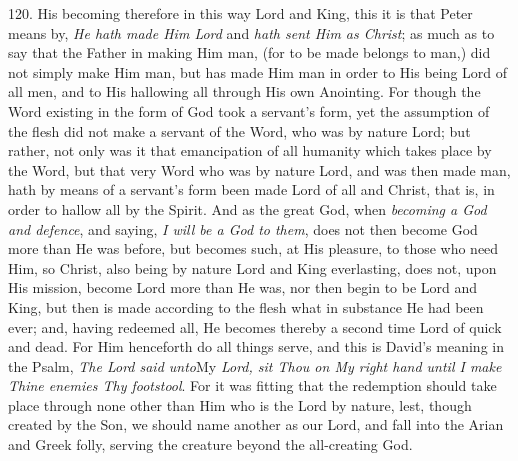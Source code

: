 120. His becoming therefore in
this way Lord and King, this it is that Peter means by, \emph{He hath
made Him Lord} and \emph{hath sent Him as Christ}; as much as to
say that the Father in making Him man, (for to be made belongs to
man,) did not simply make Him man, but has made Him man in order to
His being Lord of all men, and to His hallowing all through His own
Anointing. For though the Word existing in the form of God took a
servant's form, yet the assumption of the flesh did not make a servant
of the Word, who was by nature Lord; but rather, not only was it
that emancipation of all humanity which takes place by the Word, but
that very Word who was by nature Lord, and was then made man, hath by
means of a servant's form been made Lord of all and Christ, that is,
in order to hallow all by the Spirit. And as the great God, when \emph{becoming
a God and defence}, and saying, \emph{I will be a God to them},
does not then become God more than He was before, but becomes such, at
His pleasure, to those who need Him, so Christ, also being by nature
Lord and King everlasting, does not, upon His mission, become Lord
more than He was, nor then begin to be Lord and King, but then is made
according to the flesh what in substance He had been ever; and, having
redeemed all, He becomes thereby a second time Lord of quick and dead.
For Him henceforth do all things serve, and this is David's meaning in
the Psalm, \emph{The Lord said unto}My \emph{Lord, sit Thou on My right
hand until I make Thine enemies Thy footstool}. For it was fitting
that the redemption should take place through none other than Him who
is the Lord by nature, lest, though created by the Son, we should name
another as our Lord, and fall into the Arian and Greek folly, serving
the creature beyond the all-creating God.

